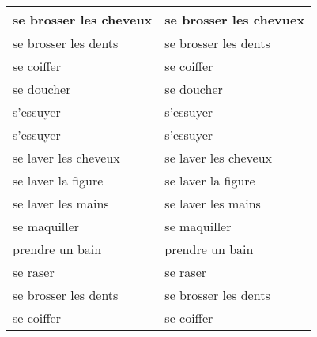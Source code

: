 \documentclass{article}
\date{}
\newcommand{\tabrowEnd}{\rule{0pt}{35pt}\\}
\begin{document}
  \centering
  \noindent
  {\LARGE
    \begin{tabular}{| p{} | p{} |}
      \hline
      se brosser les cheveux & se brosser les chevuex \tabrowEnd
      \hline
      se brosser les dents   & se brosser les dents \tabrowEnd
      \hline
      se coiffer             & se coiffer \tabrowEnd
      \hline
      se doucher             & se doucher \tabrowEnd
      \hline
      s'essuyer              & s'essuyer \tabrowEnd
      \hline
      s'essuyer              & s'essuyer \tabrowEnd
      \hline
      se laver les cheveux   & se laver les cheveux \tabrowEnd
      \hline
      se laver la figure     & se laver la figure \tabrowEnd
      \hline
      se laver les mains     & se laver les mains \tabrowEnd
      \hline
      se maquiller           & se maquiller \tabrowEnd
      \hline
      prendre un bain        & prendre un bain \tabrowEnd
      \hline
      se raser               & se raser \tabrowEnd
      \hline
      se brosser les dents   & se brosser les dents \tabrowEnd
      \hline
      se coiffer             & se coiffer \tabrowEnd
      \hline
    \end{tabular}
  }
\end{document}
